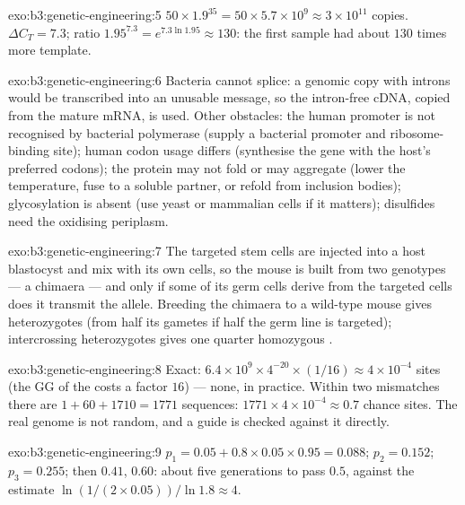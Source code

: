 \begin{solution}{exo:b3:genetic-engineering:5}
$50\times 1.9^{35} = 50\times 5.7\times 10^{9} \approx 3\times 10^{11}$
copies. $\Delta C_{T} = 7.3$; ratio $1.95^{7.3} = e^{7.3\ln 1.95}
\approx 130$: the first sample had about $130$ times more template.
\end{solution}

\begin{solution}{exo:b3:genetic-engineering:6}
Bacteria cannot splice: a genomic copy with introns would be
transcribed into an unusable message, so the intron-free cDNA, copied
from the mature mRNA, is used. Other obstacles: the human promoter is
not recognised by bacterial polymerase (supply a bacterial promoter and
ribosome-binding site); human codon usage differs (synthesise the gene
with the host's preferred codons); the protein may not fold or may
aggregate (lower the temperature, fuse to a soluble partner, or refold
from inclusion bodies); glycosylation is absent (use yeast or mammalian
cells if it matters); disulfides need the oxidising periplasm.
\end{solution}

\begin{solution}{exo:b3:genetic-engineering:7}
The targeted stem cells are injected into a host blastocyst and mix
with its own cells, so the mouse is built from two genotypes --- a
chimaera --- and only if some of its germ cells derive from the
targeted cells does it transmit the allele. Breeding the chimaera to a
wild-type mouse gives heterozygotes (from half its gametes if half the
germ line is targeted); intercrossing heterozygotes gives one quarter
homozygous .
\end{solution}

\begin{solution}{exo:b3:genetic-engineering:8}
Exact: $6.4\times 10^{9}\times 4^{-20}\times (1/16) \approx 4\times
10^{-4}$ sites (the GG of the  costs a factor $16$) --- none, in
practice. Within two mismatches there are $1 + 60 + 1710 = 1771$
sequences: $1771\times 4\times 10^{-4} \approx 0.7$ chance sites. The
real genome is not random, and a guide is checked against it directly.
\end{solution}

\begin{solution}{exo:b3:genetic-engineering:9}
$p_{1} = 0.05 + 0.8\times 0.05\times 0.95 = 0.088$; $p_{2} = 0.152$;
$p_{3} = 0.255$; then $0.41$, $0.60$: about five generations to pass
$0.5$, against the estimate $\ln(1/(2\times 0.05))/\ln 1.8 \approx 4$.
\end{solution}

